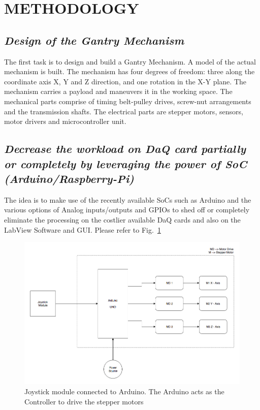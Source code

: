 \documentclass[MTech]{iitmdiss}
\begin{document}
\section{METHODOLOGY}

\subsection{\emph{Design of the Gantry Mechanism}}


The first task is to design and build a Gantry Mechanism. A model of the actual mechanism is built. The mechanism has four degrees of freedom: three along the coordinate axis X, Y and Z direction, and one rotation in the X-Y plane. The mechanism carries a payload and maneuvers it in the working space. The mechanical parts comprise of timing belt-pulley drives, screw-nut arrangements and the transmission shafts. The electrical parts are stepper motors, sensors, motor drivers and microcontroller unit.

\subsection{\emph{Decrease the workload on DaQ card partially or completely by leveraging the power of SoC (Arduino/Raspberry-Pi)}}

The idea is to make use of the recently available SoCs such as Arduino and the various options of Analog inputs/outputs and GPIOs to shed off or completely eliminate the processing on the costlier available DaQ cards and also on the LabView Software and GUI. Please refer to Fig.~\ref{joystic}

\begin{figure}[h!]
	\includegraphics[width=\linewidth]{ffigures/joystick_diag}	
	\caption{ Joystick module connected to Arduino. The Arduino acts as the Controller to drive the stepper motors}
	\label{joystic}
\end{figure}
\end{document}
